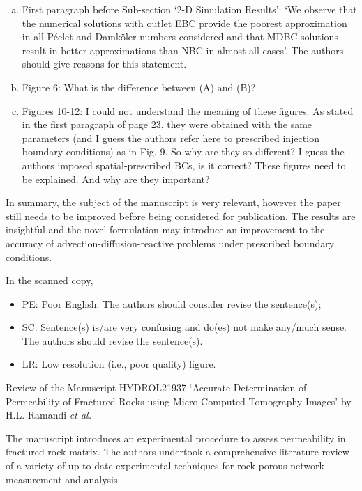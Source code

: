 \documentclass[14pt,twoside]{report}
\begin{document}
\begin{enumerate}[(a)]
%
\item First paragraph before Sub-section `2-D Simulation Results': `We observe that the numerical solutions with outlet EBC provide the poorest approximation in all P\'eclet and Damk\"oler numbers considered and that MDBC solutions result in better approximations than NBC in almost all cases'. The authors should give reasons for this statement.
%
\item Figure 6: What is the difference between (A) and (B)?
%
\item Figures 10-12:  I could not understand the meaning of these figures. As stated in the first paragraph of page 23, they were obtained with the same parameters (and I guess the authors refer here to prescribed injection boundary conditions) as in Fig. 9. So why are they so different? I guess the authors imposed spatial-prescribed BCs, is it correct? These figures need to be explained. And why are they important?
%
\end{enumerate}

In summary, the subject of the manuscript is very relevant, however the paper still needs to be improved before being considered for publication. The results are insightful and the novel formulation may introduce an improvement to the accuracy of advection-diffusion-reactive problems under prescribed boundary conditions. 


In the scanned copy,
\begin{itemize}
\item PE: Poor English. The authors should consider revise the sentence(s);
\item SC: Sentence(s) is/are very confusing and do(es) not make any/much sense. The authors should revise the sentence(s).
\item LR: Low resolution (i.e., poor quality) figure.
\end{itemize}




\clearpage

\begin{center}
  {\Large Review of the Manuscript HYDROL21937 `Accurate Determination of Permeability of Fractured Rocks using Micro-Computed Tomography Images' by H.L. Ramandi {\it et al.}}
\end{center}

\medskip

The manuscript introduces an experimental procedure to assess permeability in fractured rock matrix. The authors undertook a comprehensive literature review of a variety of up-to-date experimental techniques for rock porous network measurement and analysis.
\end{document}
